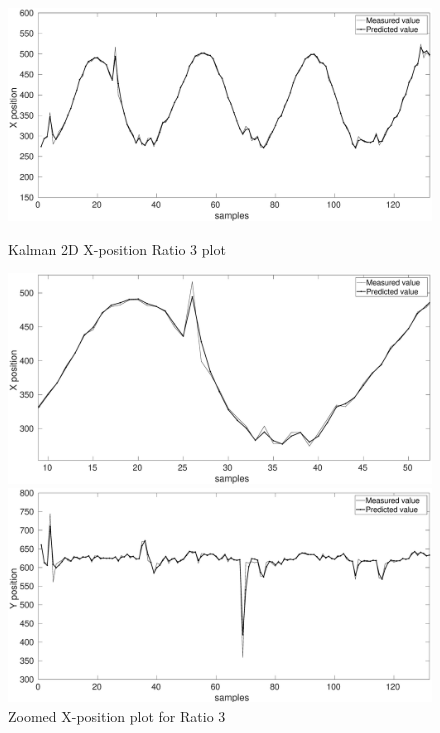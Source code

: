 \documentclass[12pt]{article}
\begin{document}
\newpage
\begin{figure}[ht!]
\centering
\begin{minipage}{0.5\textwidth}
\centering
	\includegraphics[width = \textwidth]{./Figures/part2Ratio3X.eps}
	\caption{Kalman 2D X-position Ratio 3 plot }
	\label{fig:kalman 2D XRat3}
\end{minipage}%
\begin{minipage}{0.5\textwidth}
\centering
	\includegraphics[width = \textwidth]{./Figures/part2Ratio3Xzoomed.eps}
	\caption{ Zoomed X-position plot for Ratio 3}
	\label{fig: kalman 2D XRat3 zoom}
\end{minipage}
\begin{minipage}{0.5\textwidth}
\centering
	\includegraphics[width = \textwidth]{./Figures/part2Ratio3Y.eps}

\end{minipage}
\end{figure}
\end{document}
